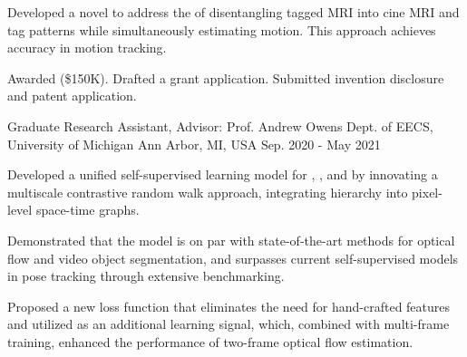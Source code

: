 \begin{cventries}
{\begin{cvitems}
        \item{Developed a novel   to address the  of disentangling tagged MRI into cine MRI and tag patterns while simultaneously estimating motion. This approach achieves  accuracy in motion tracking.}
        \item{Awarded  (\$150K). Drafted a  grant application. Submitted invention disclosure and patent application.}
    	\end{cvitems}
    }


    \cventry
    {Graduate Research Assistant, Advisor: Prof. Andrew Owens} %
    {Dept. of EECS, University of Michigan} %
    {Ann Arbor, MI, USA} %
    {Sep. 2020 - May 2021} %
    {
      \begin{cvitems} %
      \item{Developed a unified self-supervised learning model for , , and  by innovating a multiscale contrastive random walk approach, integrating hierarchy into pixel-level space-time graphs.}
      \item{Demonstrated that the model is on par with state-of-the-art  methods for optical flow and video object segmentation, and surpasses current self-supervised models in pose tracking through extensive benchmarking.}
      \item{Proposed a new loss function that eliminates the need for hand-crafted features and utilized  as an additional learning signal, which, combined with multi-frame training, enhanced the performance of two-frame optical flow estimation.}
       \end{cvitems}
    }
    

\end{cventries}
